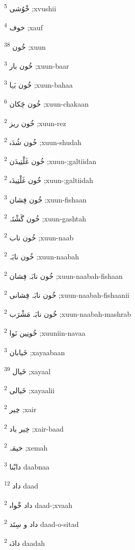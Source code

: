 \documentclass[12pt]{article}
\begin{document}
\begin{RTL}
\begin{multicols}{5}
{\ur خْوُشی}   \textsuperscript{5} ;xvushii

{\ur خوف}   \textsuperscript{4} ;xauf

{\ur خُون}   \textsuperscript{38} ;xuun

{\ur خُون بار}   \textsuperscript{3} ;xuun-baar

{\ur خُون بَہا}   \textsuperscript{3} ;xuun-bahaa

{\ur خُون چَکان}   \textsuperscript{6} ;xuun-chakaan

{\ur خُون ریز}   \textsuperscript{2} ;xuun-rez

{\ur خُون شُدَہ}   \textsuperscript{2} ;xuun-shudah

{\ur خُون غَلْتِیدَن}   \textsuperscript{2} ;xuun-;galtiidan

{\ur خُون غَلْتِیدَہ}   \textsuperscript{2} ;xuun-;galtiidah

{\ur خُون فِشان}   \textsuperscript{3} ;xuun-fishaan

{\ur خُون گَشْتَہ}   \textsuperscript{2} ;xuun-gashtah

{\ur خُون ناب}   \textsuperscript{2} ;xuun-naab

{\ur خُون نابَہ}   \textsuperscript{2} ;xuun-naabah

{\ur خُون نابَہ فِشان}   \textsuperscript{2} ;xuun-naabah-fishaan

{\ur خُون نابَہ فِشانی}   \textsuperscript{2} ;xuun-naabah-fishaanii

{\ur خُون نابَہ مَشْرَب}   \textsuperscript{2} ;xuun-naabah-mashrab

{\ur خُونِین نَوا}   \textsuperscript{2} ;xuuniin-navaa

{\ur خَیابان}   \textsuperscript{3} ;xayaabaan

{\ur خَیال}   \textsuperscript{39} ;xayaal

{\ur خَیالی}   \textsuperscript{2} ;xayaalii

{\ur خِیر}   \textsuperscript{2} ;xair

{\ur خِیر باد}   \textsuperscript{2} ;xair-baad

{\ur خیمَہ}   \textsuperscript{2} ;xemah

{\ur دابْنا}   \textsuperscript{3} daabnaa

{\ur داد}   \textsuperscript{12} daad

{\ur داد خْواہ}   \textsuperscript{2} daad-;xvaah

{\ur داد و سِتَد}   \textsuperscript{2} daad-o-sitad

{\ur دادَہ}   \textsuperscript{2} daadah


\end{multicols}
\end{RTL}
\end{document}
